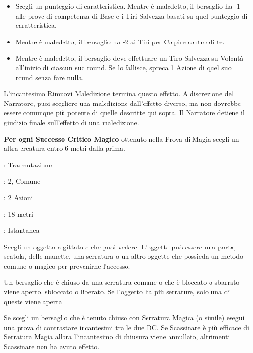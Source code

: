 \begin{multicols}{2}
\begin{itemize}[leftmargin=*] \setlength{\itemsep}{0pt}
	\item Scegli un punteggio di caratteristica. Mentre è maledetto, il bersaglio ha -1 alle prove di competenza di Base e i Tiri Salvezza basati su quel punteggio di caratteristica.
	\item Mentre è maledetto, il bersaglio ha -2 ai Tiri per Colpire contro di te.
	\item Mentre è maledetto, il bersaglio deve effettuare un Tiro Salvezza su Volontà all'inizio di ciascun suo round. Se lo fallisce, spreca 1 Azione di quel suo round senza fare nulla.
\end{itemize}

L'incantesimo \hyperlink{Rimuovi Maledizione}{Rimuovi Maledizione} termina questo effetto. A discrezione del Narratore, puoi scegliere una maledizione dall'effetto diverso, ma non dovrebbe essere comunque più potente di quelle descritte qui sopra. Il Narratore detiene il giudizio finale sull'effetto di una maledizione.

\textbf{Per ogni Successo Critico Magico} ottenuto nella Prova di Magia scegli un altra creatura entro 6 metri dalla prima.

\label{knock}
\noindent\colorbox{OBSSgold!10}{
\begin{minipage}{0.95\linewidth}
\begin{description}[noitemsep, topsep=0pt, parsep=0pt, partopsep=0pt, leftmargin=0cm, labelwidth=1.3cm]
	\item[\textbf{Lista}]: Trasmutazione
	\item[\textbf{Livello}]: 2, Comune
	\item[\textbf{Lancio}]: 2 Azioni
	\item[\textbf{Gittata}]: 18 metri
	\item[\textbf{Durata}]: Istantanea
\end{description}
\end{minipage}}\smallskip

Scegli un oggetto a gittata e che puoi vedere. L'oggetto può essere una porta, scatola, delle manette, una serratura o un altro oggetto che possieda un metodo comune o magico per prevenirne l'accesso.

Un bersaglio che è chiuso da una serratura comune o che è bloccato o sbarrato viene aperto, sbloccato o liberato. Se l'oggetto ha più serrature, solo una di queste viene aperta.

Se scegli un bersaglio che è tenuto chiuso con Serratura Magica (o simile) esegui una prova di \hyperlink{contrastareincantesimi}{contrastare incantesimi} tra le due DC. Se Scassinare è più efficace di Serratura Magia allora l'incantesimo di chiusura viene annullato, altrimenti Scassinare non ha avuto effetto.


\end{multicols}
